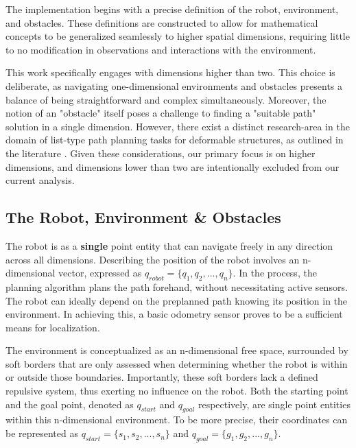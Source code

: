\documentclass{IEEEtaes}
\begin{document}
{\begin{figure}[t!]
    \centering
    \vspace{0.5em}
\end{figure}

The implementation begins with a precise definition of the robot, environment, and obstacles. These definitions are constructed to allow for mathematical concepts to be generalized seamlessly to higher spatial dimensions, requiring little to no modification in observations and interactions with the environment.

This work specifically engages with dimensions higher than two. This choice is deliberate, as navigating one-dimensional environments and obstacles presents a balance of being straightforward and complex simultaneously. Moreover, the notion of an "obstacle" itself poses a challenge to finding a "suitable path" solution in a single dimension. However, there exist a distinct research-area in the domain of list-type path planning tasks for deformable structures, as outlined in the literature \cite{one-dim}. Given these considerations, our primary focus is on higher dimensions, and dimensions lower than two are intentionally excluded from our current analysis.

\subsection{The Robot, Environment \& Obstacles }

The robot is as a \textbf{single} point entity that can navigate freely in any direction across all dimensions. Describing the position of the robot involves an n-dimensional vector, expressed as $q_{robot} = \{q_1, q_2, ..., q_n\}$. In the process, the planning algorithm plans the path forehand, without necessitating active sensors. The robot can ideally depend on the preplanned path knowing its position in the environment. In achieving this, a basic odometry sensor proves to be a sufficient means for localization.

The environment is conceptualized as an n-dimensional free space, surrounded by soft borders that are only assessed when determining whether the robot is within or outside those boundaries. Importantly, these soft borders lack a defined repulsive system, thus exerting no influence on the robot. Both the starting point and the goal point, denoted as $q_{start}$ and $q_{goal}$ respectively, are single point entities within this n-dimensional environment. To be more precise, their coordinates can be represented as $q_{start} = \{s_1, s_2, ... ,s_n\}$ and $q_{goal} = \{g_1, g_2, ... ,g_n\}$.

}
\end{document}
